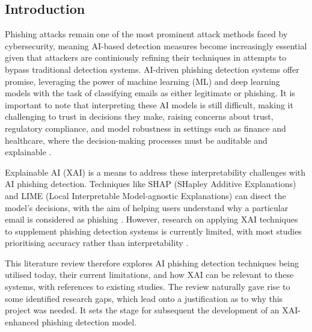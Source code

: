 \subsection*{Introduction}

Phishing attacks remain one of the most prominent attack methods faced by cybersecurity, meaning AI-based detection measures become increasingly essential given that attackers are continiously refining their techniques in attempts to bypass traditional detection systems. AI-driven phishing detection systems offer promise, leveraging the power of machine learning (ML) and deep learning models with the task of classifying emails as either legitimate or phishing. It is important to note that interpreting these AI models is still difficult, making it challenging to trust in decisions they make, raising concerns about trust, regulatory compliance, and model robustness in settings such as finance and healthcare, where the decision-making processes must be auditable and explainable \citep{jain2022survey}.\newline

\noindent Explainable AI (XAI) is a means to address these interpretability challenges with AI phishing detection. Techniques like SHAP (SHapley Additive Explanations) and LIME (Local Interpretable Model-agnostic Explanations) can disect the model's decisions, with the aim of helping users understand why a particular email is considered as phishing \citep{lundberg2017unified}. However, research on applying XAI techniques to supplement phishing detection systems is currently limited, with most studies prioritising accuracy rather than interpretability \citep{ribeiro2016model}.\newline

\noindent This literature review therefore explores AI phishing detection techniques being utilised today, their current limitations, and how XAI can be relevant to these systems, with references to existing studies. The review naturally gave rise to some identified research gaps, which lead onto a justification as to why this project was needed. It sets the stage for subsequent the development of an XAI-enhanced phishing detection model.

